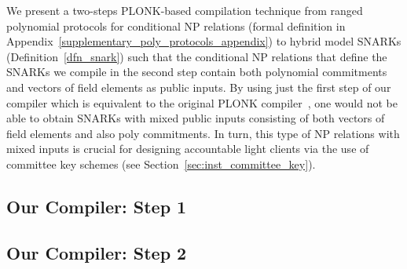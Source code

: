 \noindent We present a two-steps PLONK-based compilation technique from 
ranged polynomial protocols for conditional NP relations (formal definition in Appendix~\ref{supplementary_poly_protocols_appendix}) to hybrid 
model SNARKs (Definition~\ref{dfn_snark}) such that the conditional NP relations that define the SNARKs we compile in the 
second step contain both polynomial commitments and vectors of field elements as public inputs. By using just the first step of our 
compiler which is equivalent to the original PLONK compiler~\cite{plonk}, one would 
not be able to obtain SNARKs with mixed public inputs consisting of both vectors of field elements and also poly commitments. 
In turn, this type of NP relations with mixed inputs is crucial for designing accountable light clients via the use of committee key schemes 
(see Section~\ref{sec:inst_committee_key}).\\
\vspace{-0.2in}

\subsection{Our Compiler: Step 1} 
\label{compiler_step_1}
\vspace{-0.05in}
%

\vspace{-0.2in}
\subsection{Our Compiler: Step 2}
\label{compiler_step_2}
\vspace{-0.05in}


